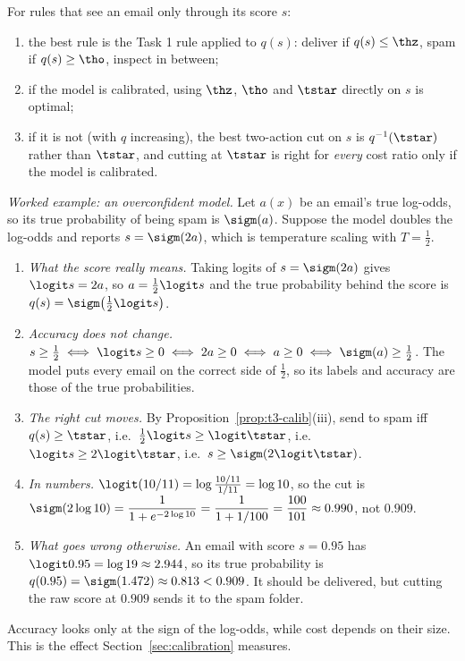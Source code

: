 \begin{proposition}\label{prop:t3-calib}
For rules that see an email only through its score $s$:
\begin{enumerate}[label=(\roman*),itemsep=1pt]
  \item the best rule is the Task 1 rule applied to $q(s)$: deliver if $q(s)\le\thz$, spam if
        $q(s)\ge\tho$, inspect in between;
  \item if the model is calibrated, using $\thz$, $\tho$ and $\tstar$ directly on $s$ is optimal;
  \item if it is not (with $q$ increasing), the best two-action cut on $s$ is $q^{-1}(\tstar)$ rather than
        $\tstar$, and cutting at $\tstar$ is right for \emph{every} cost ratio only if the model is calibrated.
\end{enumerate}
\end{proposition}

\emph{Worked example: an overconfident model.} Let $a(x)$ be an email's true log-odds, so its true
probability of being spam is $\sigm(a)$. Suppose the model doubles the log-odds and reports
$s=\sigm(2a)$, which is temperature scaling with $T=\tfrac12$.
\begin{enumerate}[label=\arabic*.,itemsep=1pt]
  \item \emph{What the score really means.} Taking logits of $s=\sigm(2a)$ gives $\logit s=2a$, so
        $a=\tfrac12\logit s$ and the true probability behind the score is $q(s)=\sigm\big(\tfrac12\logit s\big)$.
  \item \emph{Accuracy does not change.} $s\ge\tfrac12\iff\logit s\ge0\iff 2a\ge0\iff a\ge0\iff\sigm(a)\ge\tfrac12$.
        The model puts every email on the correct side of $\tfrac12$, so its labels and accuracy are those of
        the true probabilities.
  \item \emph{The right cut moves.} By Proposition~\ref{prop:t3-calib}(iii), send to spam iff $q(s)\ge\tstar$, i.e.\
        $\tfrac12\logit s\ge\logit\tstar$, i.e.\ $\logit s\ge2\logit\tstar$, i.e.\ $s\ge\sigm(2\logit\tstar)$.
  \item \emph{In numbers.} $\logit(10/11)=\log\frac{10/11}{1/11}=\log10$, so the cut is
        $\sigm(2\log10)=\dfrac{1}{1+e^{-2\log10}}=\dfrac{1}{1+1/100}=\dfrac{100}{101}\approx0.990$, not $0.909$.
  \item \emph{What goes wrong otherwise.} An email with score $s=0.95$ has $\logit0.95=\log19\approx2.944$,
        so its true probability is $q(0.95)=\sigm(1.472)\approx0.813<0.909$. It should be delivered, but
        cutting the raw score at $0.909$ sends it to the spam folder.
\end{enumerate}
Accuracy looks only at the sign of the log-odds, while cost depends on their size. This is the effect
Section~\ref{sec:calibration} measures.

